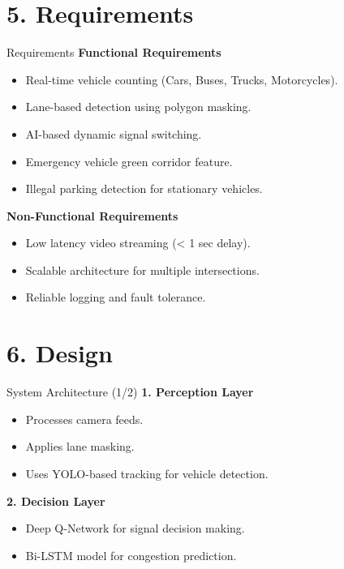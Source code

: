 \documentclass[aspectratio=169]{beamer}
\begin{document}
\section{5. Requirements}

\begin{frame}{Requirements}
\textbf{Functional Requirements}
\begin{itemize}
    \item Real-time vehicle counting (Cars, Buses, Trucks, Motorcycles).
    \item Lane-based detection using polygon masking.
    \item AI-based dynamic signal switching.
    \item Emergency vehicle green corridor feature.
    \item Illegal parking detection for stationary vehicles.
\end{itemize}

\vspace{0.3cm}

\textbf{Non-Functional Requirements}
\begin{itemize}
    \item Low latency video streaming (< 1 sec delay).
    \item Scalable architecture for multiple intersections.
    \item Reliable logging and fault tolerance.
\end{itemize}
\end{frame}

\section{6. Design}

\begin{frame}{System Architecture (1/2)}
\textbf{1. Perception Layer}
\begin{itemize}
    \item Processes camera feeds.
    \item Applies lane masking.
    \item Uses YOLO-based tracking for vehicle detection.
\end{itemize}

\textbf{2. Decision Layer}
\begin{itemize}
    \item Deep Q-Network for signal decision making.
    \item Bi-LSTM model for congestion prediction.
\end{itemize}
\end{frame}
\end{document}
